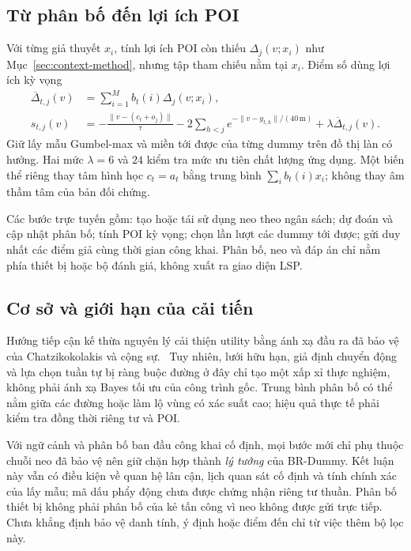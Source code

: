 \subsection{Từ phân bố đến lợi ích POI}

Với từng giả thuyết $x_i$, tính lợi ích POI còn thiếu $\Delta_j(v;x_i)$ như Mục~\ref{sec:context-method}, nhưng tập tham chiếu nằm tại $x_i$. Điểm số dùng lợi ích kỳ vọng
\[
\begin{aligned}
\overline\Delta_{t,j}(v)&=\sum_{i=1}^{M}b_t(i)\Delta_j(v;x_i),\\
s_{t,j}(v)&=-\frac{\|v-(c_t+o_j)\|}{\tau}
-2\sum_{h<j}e^{-\|v-y_{t,h}\|/(40\,\mathrm m)}
+\lambda\overline\Delta_{t,j}(v).
\end{aligned}
\]
Giữ lấy mẫu Gumbel-max và miền tới được của từng dummy trên đồ thị làn có hướng. Hai mức $\lambda=6$ và $24$ kiểm tra mức ưu tiên chất lượng ứng dụng. Một biến thể riêng thay tâm hình học $c_t=a_t$ bằng trung bình $\sum_i b_t(i)x_i$; không thay âm thầm tâm của bản đối chứng.

Các bước trực tuyến gồm: tạo hoặc tái sử dụng neo theo ngân sách; dự đoán và cập nhật phân bố; tính POI kỳ vọng; chọn lần lượt các dummy tới được; gửi duy nhất các điểm giả cùng thời gian công khai. Phân bố, neo và đáp án chỉ nằm phía thiết bị hoặc bộ đánh giá, không xuất ra giao diện LSP.

\subsection{Cơ sở và giới hạn của cải tiến}

Hướng tiếp cận kế thừa nguyên lý cải thiện utility bằng ánh xạ đầu ra đã bảo vệ của Chatzikokolakis và cộng sự.~\citep{chatzikokolakis2017utility} Tuy nhiên, lưới hữu hạn, giả định chuyển động và lựa chọn tuần tự bị ràng buộc đường ở đây chỉ tạo một xấp xỉ thực nghiệm, không phải ánh xạ Bayes tối ưu của công trình gốc. Trung bình phân bố có thể nằm giữa các đường hoặc làm lộ vùng có xác suất cao; hiệu quả thực tế phải kiểm tra đồng thời riêng tư và POI.

Với ngữ cảnh và phân bố ban đầu công khai cố định, mọi bước mới chỉ phụ thuộc chuỗi neo đã bảo vệ nên giữ chặn hợp thành \emph{lý tưởng} của BR-Dummy. Kết luận này vẫn có điều kiện về quan hệ lân cận, lịch quan sát cố định và tính chính xác của lấy mẫu; mã dấu phẩy động chưa được chứng nhận riêng tư thuần. Phân bố thiết bị không phải phân bố của kẻ tấn công vì neo không được gửi trực tiếp. Chưa khẳng định bảo vệ danh tính, ý định hoặc điểm đến chỉ từ việc thêm bộ lọc này.
